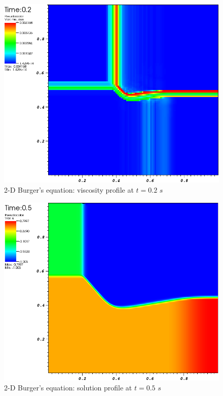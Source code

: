 %
\begin{figure}[H]
	\centering
	\includegraphics[width=\textwidth]{figures/Burger2D_visc_t0p2.png}
	\caption{2-D Burger's equation: viscosity profile at $t=0.2$ $s$}
	\label{fig:2d_burger_visc_t0p2}
\end{figure}
%
\begin{figure}[H]
	\centering
	\includegraphics[width=\textwidth]{figures/Burger2D_sol_t0p5.png}
	\caption{2-D Burger's equation: solution profile at $t=0.5$ $s$}
	\label{fig:2d_burger_sol_t0p5}
\end{figure}
